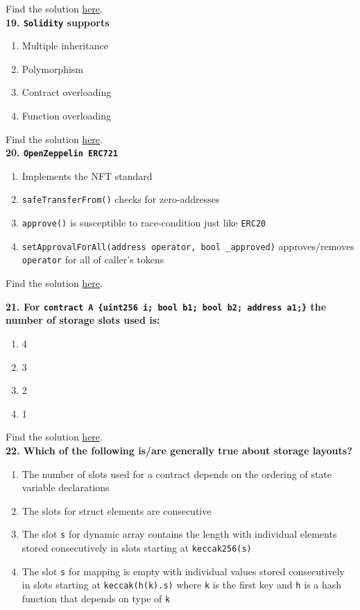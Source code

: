 Find the solution \hyperref[sec:exam3_q18]{here}.\\

\textbf{19. \texttt{Solidity} supports}

\begin{enumerate}[label=\Alph*.]
    \item Multiple inheritance
    \item Polymorphism
    \item Contract overloading
    \item Function overloading
\end{enumerate}

Find the solution \hyperref[sec:exam3_q19]{here}.\\

\textbf{20. \texttt{OpenZeppelin ERC721}}

\begin{enumerate}[label=\Alph*.]
    \item Implements the NFT standard
    \item\verb|safeTransferFrom()| checks for zero-addresses
    \item\verb|approve()| is susceptible to race-condition just like \verb|ERC20|
    \item\verb|setApprovalForAll(address operator, bool _approved)| approves/removes \verb|operator| for all of caller's tokens
\end{enumerate}

Find the solution \hyperref[sec:exam3_q20]{here}.\\

\pagebreak

\textbf{21. For \texttt{contract A \{uint256 i; bool b1; bool b2; address a1;\}} the number of storage slots used is:}

\begin{enumerate}[label=\Alph*.]
    \item 4
    \item 3
    \item 2
    \item 1
\end{enumerate}

Find the solution \hyperref[sec:exam3_q21]{here}.\\

\textbf{22. Which of the following is/are generally true about storage layouts?}

\begin{enumerate}[label=\Alph*.]
    \item The number of slots used for a contract depends on the ordering of state variable declarations
    \item The slots for struct elements are consecutive
    \item  The slot \verb|s| for dynamic array contains the length with individual elements stored consecutively in slots starting at \verb|keccak256(s)|
    \item The slot \verb|s| for mapping is empty with individual values stored consecutively in slots starting at \verb|keccak(h(k).s)| where \verb|k| is the first key and \verb|h| is a hash function that depends on type of \verb|k|
\end{enumerate}

